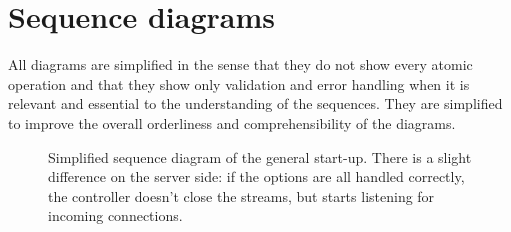\documentclass[a4paper]{article}
\begin{document}
	\newpage\section{Sequence diagrams}\label{app:sd}
	All diagrams are simplified in the sense that they do not show every atomic operation and that they show only validation and error handling when it is relevant and essential to the understanding of the sequences. They are simplified to improve the overall orderliness and comprehensibility of the diagrams.
	\begin{figure}[hb]
	\centering
	\caption{Simplified sequence diagram of the general start-up. There is a slight difference on the server side: if the options are all handled correctly, the controller doesn't close the streams, but starts listening for incoming connections.}
	\label{fig:sd_generalstartup}
	\end{figure}
	
\end{document}
